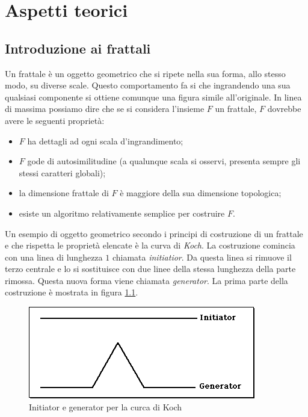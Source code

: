 \documentclass[11pt,a4paper]{scrreprt}
\begin{document}
\chapter{Aspetti teorici}

\section{Introduzione ai frattali}

Un frattale è un oggetto geometrico che si ripete nella sua forma, allo stesso modo, su diverse scale. Questo comportamento fa si che ingrandendo una sua qualsiasi componente si ottiene comunque una figura simile all'originale. In linea di massima possiamo dire che se si considera l'insieme $F$ un frattale, $F$ dovrebbe avere le seguenti proprietà:

\begin{itemize}
\item $F$ ha dettagli ad ogni scala d'ingrandimento;
\item $F$ gode di autosimilitudine (a qualunque scala si osservi, presenta sempre gli stessi caratteri globali);
\item la dimensione frattale di $F$ è maggiore della sua dimensione topologica;
\item esiste un algoritmo relativamente semplice per costruire $F$.
\end{itemize}



Un esempio di oggetto geometrico secondo i principi di costruzione di un frattale e che rispetta le proprietà elencate è la curva di \textit{Koch}. La costruzione comincia con una linea di lunghezza $1$ chiamata \textit{initiatior}. Da questa linea si rimuove il terzo centrale e lo si sostituisce con due linee della stessa lunghezza della parte rimossa. Questa nuova forma viene chiamata \textit{generator}. La prima parte della costruzione è mostrata in figura \ref{fig:k1}.

\begin{figure}[!ht]
\centering
\includegraphics[scale=0.55]{images/koch1.png}
\caption{Initiator e generator per la curca di Koch}
\label{fig:k1}
\end{figure}
\end{document}
